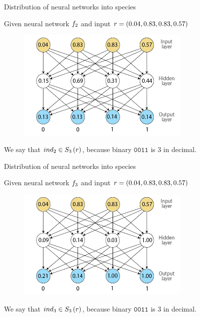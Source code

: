 \begin{frame}{Distribution of neural networks into species}
\begin{center}
Given neural network $f_2$ and input $r = (0.04, 0.83, 0.83, 0.57)$
  \begin{figure}[p]
  \includegraphics[width=0.75\textwidth]{images/nntdexample2.png}
  \end{figure}
We say that $ind_2 \in S_{3}\left(r\right)$, because binary $\texttt{0011}$ is $3$ in decimal.
\end{center}
\end{frame}

\begin{frame}{Distribution of neural networks into species}
\begin{center}
Given neural network $f_3$ and input $r = (0.04, 0.83, 0.83, 0.57)$
  \begin{figure}[p]
  \includegraphics[width=0.75\textwidth]{images/nntdexample3.png}
  \end{figure}
We say that $ind_3 \in S_{3}\left(r\right)$, because binary $\texttt{0011}$ is $3$ in decimal.
\end{center}
\end{frame}

